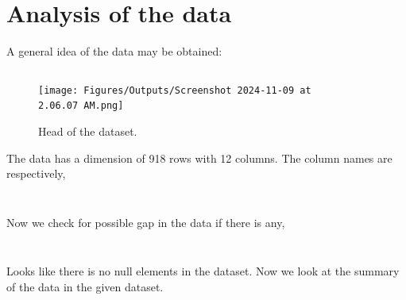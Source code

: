 \chapter{Analysis of the data}
\label{cp:analysis of the data}
A general idea of the data may be obtained:
\begin{listing}[!htpb]
\inputminted{octave}{Code/pre1.m}
\end{listing}
\begin{figure}[!htpb]
    \centering
    \texttt{[image: Figures/Outputs/Screenshot 2024-11-09 at 2.06.07 AM.png]}
    \label{Table head of the data}
    \caption{Head of the dataset.}
\end{figure}

The data has a dimension of 918 rows with 12 columns. The column names are respectively, 
\begin{listing}[!htpb]
\inputminted{octave}{Code/pre2.m}
\end{listing}
\begin{listing}[!htpb]
\inputminted{octave}{Code/pre3.m}
\end{listing}

Now we check for possible gap in the data if there is any,
\begin{listing}[!htpb]
\inputminted{octave}{Code/pre4.m}
\end{listing}
\begin{longlisting}
\inputminted{octave}{Code/pre5.m}
\end{longlisting}

Looks like there is no null elements in the dataset. Now we look at the summary of the data in the given dataset. 
\begin{listing}[!htpb]
\inputminted{octave}{Code/pre6.m}
\end{listing}
\begin{longlisting}
\inputminted{octave}{Code/pre7.m}
\end{longlisting}

